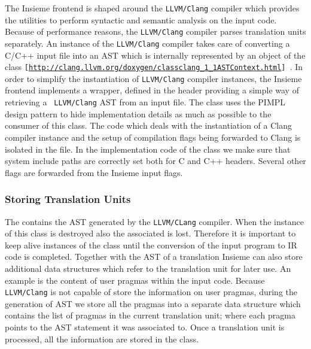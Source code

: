 The Insieme frontend is shaped around the {\tt LLVM/Clang} compiler which
provides the utilities to perform syntactic and semantic analysis on the input
code. Because of performance reasons, the {\tt LLVM/Clang} compiler parses
translation units separately.  An instance of the {\tt LLVM/Clang} compiler
takes care of converting a C/C++ input file into an AST which is internally
represented by an object of the class  
{\tt [\url{http://clang.llvm.org/doxygen/classclang_1_1ASTContext.html}] }. 
In order to simplify the instantiation of {\tt LLVM/Clang} compiler instances,
the Insieme frontend implements a wrapper,  defined in the
 header providing a simple way of retrieving a {\tt
LLVM/Clang} AST from an input file. The class uses the PIMPL design pattern to
hide implementation details as much as possible to the consumer of this class.
The code which deals with the instantiation of a Clang compiler instance and the
setup of compilation flags being forwarded to Clang is isolated in the
 file. In the implementation code of the
 class we make sure that system include paths are correctly
set both for C and C++ headers. Several other flags are forwarded from the
Insieme input flags. 

\subsubsection{Storing Translation Units}

The  contains the AST generated by the {\tt LLVM/CLang}
compiler. When the instance of this class is destroyed also the associated
 is lost. Therefore it is important to keep alive
instances of the  class until the conversion of the input
program to IR code is completed. Together with the AST of a translation Insieme
can also store additional data structures which refer to the translation unit
for later use. An example is the content of user pragmas within the input code.
Because {\tt LLVM/Clang} is not capable of store the information on user
pragmas, during the generation of AST we store all the pragmas into a separate
data structure  which contains the list of
pragmas in the current translation unit; where each pragma points to the AST
statement it was associated to. Once a translation unit is processed, all the
information are stored in the  class. 

